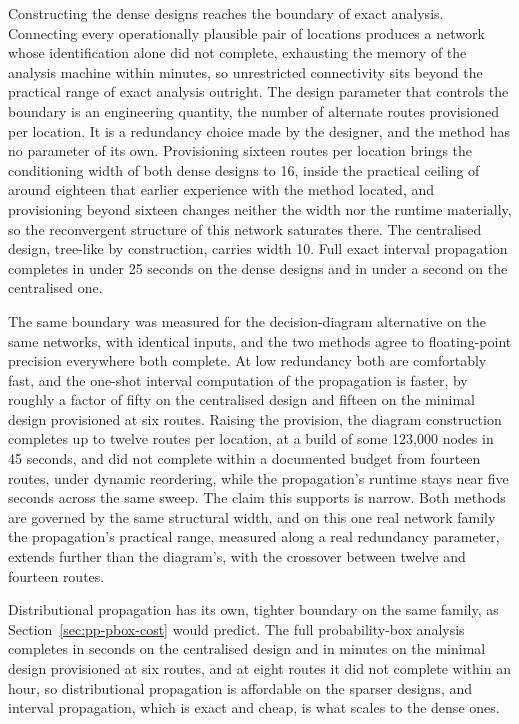 \documentclass[12pt]{report}
\begin{document}
Constructing the dense designs reaches the boundary of exact analysis. Connecting every operationally plausible pair of locations produces a network whose identification alone did not complete, exhausting the memory of the analysis machine within minutes, so unrestricted connectivity sits beyond the practical range of exact analysis outright. The design parameter that controls the boundary is an engineering quantity, the number of alternate routes provisioned per location. It is a redundancy choice made by the designer, and the method has no parameter of its own. Provisioning sixteen routes per location brings the conditioning width of both dense designs to 16, inside the practical ceiling of around eighteen that earlier experience with the method located, and provisioning beyond sixteen changes neither the width nor the runtime materially, so the reconvergent structure of this network saturates there. The centralised design, tree-like by construction, carries width 10. Full exact interval propagation completes in under 25 seconds on the dense designs and in under a second on the centralised one.

The same boundary was measured for the decision-diagram alternative on the same networks, with identical inputs, and the two methods agree to floating-point precision everywhere both complete. At low redundancy both are comfortably fast, and the one-shot interval computation of the propagation is faster, by roughly a factor of fifty on the centralised design and fifteen on the minimal design provisioned at six routes. Raising the provision, the diagram construction completes up to twelve routes per location, at a build of some 123{,}000 nodes in 45 seconds, and did not complete within a documented budget from fourteen routes, under dynamic reordering, while the propagation's runtime stays near five seconds across the same sweep. The claim this supports is narrow. Both methods are governed by the same structural width, and on this one real network family the propagation's practical range, measured along a real redundancy parameter, extends further than the diagram's, with the crossover between twelve and fourteen routes.

Distributional propagation has its own, tighter boundary on the same family, as Section~\ref{sec:pp-pbox-cost} would predict. The full probability-box analysis completes in seconds on the centralised design and in minutes on the minimal design provisioned at six routes, and at eight routes it did not complete within an hour, so distributional propagation is affordable on the sparser designs, and interval propagation, which is exact and cheap, is what scales to the dense ones.
\end{document}
